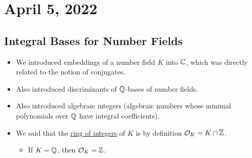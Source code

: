 \section{April 5, 2022}
\subsection{Integral Bases for Number Fields}
\recall
\begin{itemize}
    \item We introduced embeddings of a number field $K$ into $\mathbb C$, which was directly related to the notion of conjugates.
    \item Also introduced discriminants of $\mathbb Q$-bases of number fields.
    \item Also introduced algebraic integers (algebraic numbers whose minimal polynomials over $\mathbb Q$ have integral coefficients).
    \item We said that the \ul{ring of integers} of $K$ is by definition $\mathcal{O}_K = K\cap \overline{\mathbb Z}$.
          \begin{itemize}
              \item If $K = \mathbb Q$, then $\mathcal{O}_K = \mathbb Z$.
          \end{itemize}
\end{itemize}

